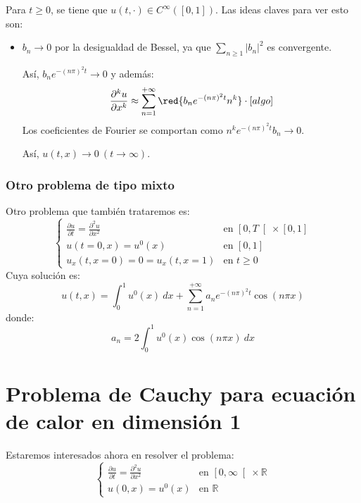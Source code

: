 \noindent
Para $t\geq 0$, se tiene que $u(t,\cdot )\in C^\infty([0,1])$. Las ideas claves para ver esto son:
\begin{itemize}
    \item $b_n\to 0$ por la desigualdad de Bessel, ya que $\sum\limits_{n\geq 1}|b_n|^2$ es convergente.

        Así, $b_ne^{-{(n\pi)}^{2}t}\to 0$ y además:
        \begin{equation*}
            \frac{\partial^k u}{\partial x^k}\approx \sum_{n=1}^{+\infty}\red{b_ne^{-{(n\pi)}^{2}t}n^k} \cdot [algo]
        \end{equation*}
        Los coeficientes de Fourier se comportan como $n^ke^{-{(n\pi)}^{2}t}b_n\to 0$. 

        Así, $u(t,x)\to 0\ (t\to\infty)$.
\end{itemize}

\subsubsection{Otro problema de tipo mixto}
\noindent
Otro problema que también trataremos es:
\begin{equation*}
    \left\{\begin{array}{ll}
            \displaystyle \frac{\partial u}{\partial t} = \frac{\partial^2u}{\partial x^2} & \text{en\ } \left[0,T\right[\times [0,1] \\
                u(t=0,x)=u^0(x) & \text{en\ } [0,1] \\
                u_x(t,x=0)= 0 = u_x(t,x=1) & \text{en\ } t\geq 0
    \end{array}\right.
\end{equation*}
Cuya solución es:
\begin{equation*}
    u(t,x) = \int_{0}^{1} u^0(x)~dx  + \sum_{n=1}^{+\infty} a_ne^{-{(n\pi)}^{2}t}\cos(n\pi x)
\end{equation*}
donde:
\begin{equation*}
    a_n = 2\int_{0}^{1} u^0(x)\cos(n\pi x)~dx 
\end{equation*}

\section{Problema de Cauchy para ecuación de calor en dimensión 1}
\noindent
Estaremos interesados ahora en resolver el problema:
\begin{equation}\label{eq:cauchy_calor}
    \left\{\begin{array}{ll}
            \displaystyle\frac{\partial u}{\partial t} = \frac{\partial^2 u}{\partial x^2} & \text{en\ } \left[0,\infty\right[\times \mathbb{R} \\
                u(0,x) = u^0(x) &\text{en\ } \mathbb{R}
    \end{array}\right.
\end{equation}

